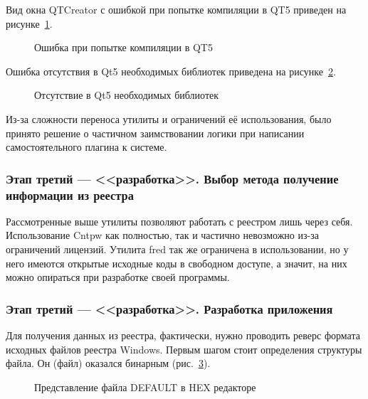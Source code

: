Вид окна QTCreator с ошибкой при попытке компиляции в QT5 приведен на рисунке~\ref{error:error}.

\begin{figure}[ht]                              %
\caption{Ошибка при попытке компиляции в QT5}
\label{error:error}
\end{figure}

Ошибка отсутствия в Qt5 необходимых библиотек приведена на рисунке~\ref{bib:bib}.
 
\begin{figure}[ht]                              %
\caption{Отсутствие в Qt5 необходимых библиотек}
\label{bib:bib}
\end{figure}

Из-за сложности переноса утилиты и ограничений её использования, было принято решение о частичном заимствовании логики при написании самостоятельного плагина к системе.

\subsubsection{Этап третий --- <<разработка>>. Выбор метода получение информации из реестра}
Рассмотренные выше утилиты позволяют работать с реестром лишь через себя. Использование Cntpw как полностью, так и частично невозможно из-за ограничений лицензий. Утилита fred так же ограничена в использовании, но у него имеются открытые исходные коды в свободном доступе, а значит, на них можно опираться при разработке своей программы.

\subsubsection{Этап третий --- <<разработка>>. Разработка приложения}
Для получения данных из реестра, фактически, нужно проводить реверс формата исходных файлов реестра Windows. Первым шагом стоит определения структуры файла. Он (файл) оказался бинарным (рис.~\ref{hex:hex}).

\begin{figure}[ht!]                        %
\caption{Представление файла DEFAULT в HEX редакторе}
\label{hex:hex}
\end{figure}

